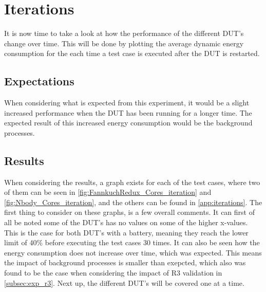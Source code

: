 \section{Iterations}

It is now time to take a look at how the performance of the different DUT's change over time. This will be done by plotting the average dynamic energy consumption for the each time a test case is executed after the DUT is restarted.

\subsection{Expectations}

When considering what is expected from this experiment, it would be a slight increased performance when the DUT has been running for a longer time. The expected result of this increased energy consumption would be the background processes. 

\subsection{Results} 

When considering the results, a graph exists for each of the test cases, where two of them can be seen in \cref*{fig:FannkuchRedux_Cores_iteration} and \cref*{fig:Nbody_Cores_iteration}, and the others can be found in \cref{app:iterations}. The first thing to consider on these graphs, is a few overall comments. It can first of all be noted some of the DUT's has no values on some of the higher x-values. This is the case for both DUT's with a battery, meaning they reach the lower limit of 40\% before executing the test cases 30 times. It can also be seen how the energy consumption does not increase over time, which was expected. This means the impact of background processes is smaller than exepcted, which also was found to be the case when considering the impact of R3 validation in \cref{subsec:exp_r3}.  Next up, the different DUT's will be covered one at a time.

